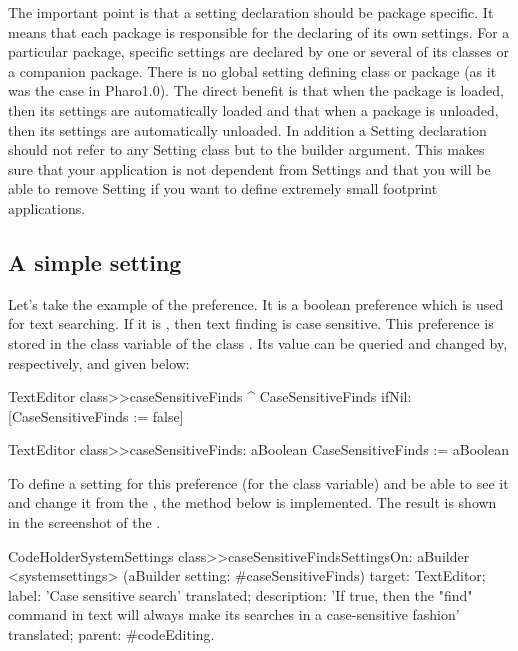 \documentclass[a4paper,10pt,twoside]{book}
\begin{document}
The important point is that a setting declaration should be package specific. It means that each package is responsible for the declaring of its own settings. For a particular package, specific settings are declared by one or several of its classes or a companion package. There is no global setting defining class or package (as it was the case in Pharo1.0). The direct benefit is that when the package is loaded, then its settings are automatically loaded and that when a package is unloaded, then its settings are automatically unloaded. In addition a Setting declaration should not refer to any Setting class but to the builder argument. This makes sure that your application is not dependent from Settings and that you will be able to remove Setting if you want to define extremely small footprint applications. 

\subsection{A simple setting}
Let's take the example of the  preference. It is a boolean preference which is used for text searching. If it is , then text finding is case sensitive. This preference is stored in the  class variable of the class . Its value can be queried and changed by, respectively,  and  given below:
\begin{code}{}
TextEditor class>>caseSensitiveFinds
	^ CaseSensitiveFinds ifNil: [CaseSensitiveFinds := false]

TextEditor class>>caseSensitiveFinds: aBoolean
	CaseSensitiveFinds := aBoolean
\end{code}

To define a setting for this preference (\ie for the  class variable) and be able to see it and change it from the \setbrowser, the method below is implemented. The result is shown in the screenshot of the . 

\begin{code}{}
CodeHolderSystemSettings class>>caseSensitiveFindsSettingsOn: aBuilder
	<systemsettings>
	(aBuilder setting: #caseSensitiveFinds) 
		target: TextEditor;
		label: 'Case sensitive search' translated;
		description: 'If true, then the "find" command in text will always make its searches in a case-sensitive fashion' translated;
		parent: #codeEditing.
\end{code}
\end{document}
